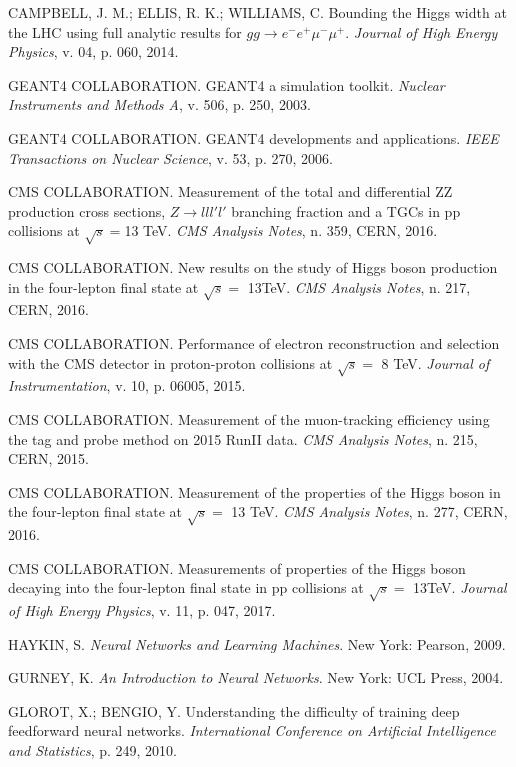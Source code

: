 \begin{thebibliography}{}
CAMPBELL, J. M.; ELLIS, R. K.; WILLIAMS, C. Bounding the Higgs width at the LHC using full analytic results for $gg \rightarrow e^{-}e^{+}\mu^{-}\mu^{+}$. \textit{Journal of High Energy Physics}, v. 04, p. 060, 2014.

GEANT4 COLLABORATION. GEANT4 a simulation toolkit. \textit{Nuclear Instruments and Methods A}, v. 506, p. 250, 2003.

GEANT4 COLLABORATION. GEANT4 developments and applications. \textit{IEEE Transactions on Nuclear Science}, v. 53, p. 270, 2006.

CMS COLLABORATION. Measurement of the total and differential ZZ production cross sections, $Z \rightarrow ll l'l'$ branching fraction and a TGCs in pp collisions at $\sqrt{s} = $13 TeV. \textit{CMS Analysis Notes}, n. 359, CERN, 2016.

CMS COLLABORATION. New results on the study of Higgs boson production in the four-lepton final state at $\sqrt{s}=$ 13TeV. \textit{CMS Analysis Notes}, n. 217, CERN, 2016.

CMS COLLABORATION. Performance of electron reconstruction and selection with the CMS detector in proton-proton collisions at $\sqrt{s}=$ 8 TeV. \textit{Journal of Instrumentation}, v. 10, p. 06005, 2015.

CMS COLLABORATION. Measurement of the muon-tracking efficiency using the tag and probe method on 2015 RunII data. \textit{CMS Analysis Notes}, n. 215, CERN, 2015.

CMS COLLABORATION. Measurement of the properties of the Higgs boson in the four-lepton final state at $\sqrt{s}=$ 13 TeV. \textit{CMS Analysis Notes}, n. 277, CERN, 2016.

CMS COLLABORATION. Measurements of properties of the Higgs boson decaying into the four-lepton final state in pp collisions at $\sqrt{s}=$ 13TeV. \textit{Journal of High Energy Physics}, v. 11, p. 047, 2017.

HAYKIN, S. \textit{Neural Networks and Learning Machines}. New York: Pearson, 2009.

GURNEY, K. \textit{An Introduction to Neural Networks}. New York: UCL Press, 2004.

GLOROT, X.; BENGIO, Y. Understanding  the  difficulty  of training deep feedforward neural networks. \textit{International Conference  on  Artificial Intelligence  and  Statistics}, p. 249, 2010.


\end{thebibliography}
